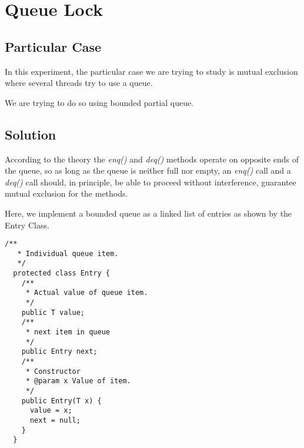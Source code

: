 


\section{\textbf{Queue Lock}}



\subsection{Particular Case}
\par
In this experiment, the particular case we are trying to study is mutual exclusion where several threads try to use a queue.
\par
We are trying to do so using bounded partial queue.
\par



\subsection{Solution}
\par
According to the theory the \textit{enq()} and \textit{deq()} methods operate on opposite ends of the queue, so as long as the queue is neither full nor empty, an \textit{enq()} call and a \textit{deq()} call should, in principle, be able to proceed without interference, guarantee mutual exclusion for the methods.
\par
Here, we implement a bounded queue as a linked list of entries as shown by the Entry Class.
\par
\begin{lstlisting}[frame=single,breaklines=true]
  /**
   * Individual queue item.
   */
  protected class Entry {
    /**
     * Actual value of queue item.
     */
    public T value;
    /**
     * next item in queue
     */
    public Entry next;
    /**
     * Constructor
     * @param x Value of item.
     */
    public Entry(T x) {
      value = x;
      next = null;
    }
  }
\end{lstlisting}


